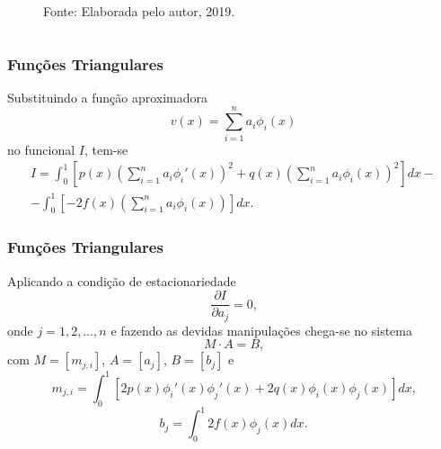 \documentclass{beamer}
\newcommand{\fonte}[1]{
	\begin{center}
		\footnotesize Fonte: #1
	\end{center}
}
\newcommand{\fonteElaboradaPeloAutor}{
	\fonte{Elaborada pelo autor, 2019.}
}
\begin{document}
{\begin{frame}
\begin{itemize}
\begin{columns}
\begin{column}{0.45\textwidth}
\begin{figure}
{
						}
						\fonteElaboradaPeloAutor
					\end{figure}
				\end{column}
			\end{columns}
		\end{itemize}
	\end{frame}
	}
	
	\begin{frame}
		\frametitle{Funções Triangulares}
		\justify
		
		Substituindo a função aproximadora
		$$
			v(x)=\sum_{i=1}^n a_i \phi_i (x)
		$$
		no funcional $I$, tem-se
		\begin{multline*}
			I = \int_{0}^{1} \left [
				p(x) \left (
					\sum_{i=1}^{n} a_i \phi_i '(x)
				\right )^2
				+ q(x) \left (
					\sum_{i=1}^{n} a_i \phi_i (x)
				\right )^2
			\right ] dx -
			\\
			- \int_{0}^{1} \left [
				- 2f(x) \left (
					\sum_{i=1}^{n} a_i \phi_i (x)
				\right )
			\right ] dx
			\text{.}
		\end{multline*}
	\end{frame}
	
	\begin{frame}
		\frametitle{Funções Triangulares}
		\justify
		
		Aplicando a condição de estacionariedade
		$$
			\frac{\partial I}{\partial a_j} = 0
			\text{,}
		$$
		onde $j=1,2,\dots,n$ e fazendo as devidas manipulações chega-se no sistema
		\pause
		$$
			M\cdot A = B
			\text{,}
		$$
		\pause
		com $M=[m_{j,i}]$, $A=[a_j]$, $B=[b_j]$ e
		$$
			m_{j,i}=\int_{0}^{1} \left [
				2p(x)\phi_i'(x)\phi_j'(x)
				+
				2q(x)\phi_i(x)\phi_j(x)
			\right ]dx
			\text{,}
		$$
		$$
			b_j=\int_{0}^{1} 2f(x)\phi_j(x)dx
			\text{.}
		$$
	\end{frame}
	
\end{document}
